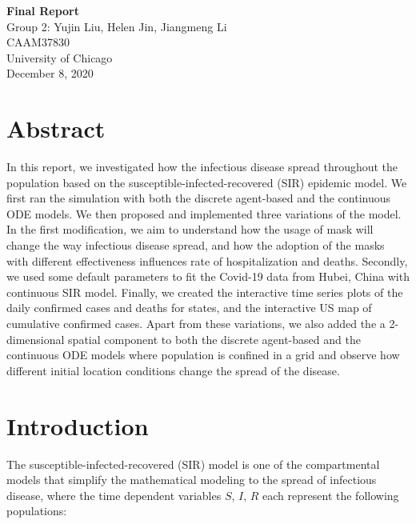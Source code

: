 \documentclass{article}
\begin{document}
\begin{titlepage}
  \begin{center}

    \huge
    \textbf{Final Report}\\
    \vspace{4.5cm}
    \LARGE
    Group 2: Yujin Liu, Helen Jin, Jiangmeng Li\\
    \vspace{4.5cm}
    \Large
    CAAM37830\\
    \vspace{1cm}
    University of Chicago\\
    \vspace{1cm}
    December 8, 2020

  \end{center}

\end{titlepage}

\section{Abstract}
In this report, we investigated how the infectious disease spread throughout the population based on the susceptible-infected-recovered (SIR) epidemic model. We first ran the simulation with both the discrete agent-based and the continuous ODE models. We then proposed and implemented three variations of the model. In the first modification, we aim to understand how the usage of mask will change the way infectious disease spread, and how the adoption of the masks with different effectiveness influences rate of hospitalization and deaths. Secondly, we used some default parameters to fit the Covid-19 data from Hubei, China with continuous SIR model. Finally, we created the interactive time series plots of the daily confirmed cases and deaths for states, and the interactive US map of cumulative confirmed cases. Apart from these variations, we also added the a 2-dimensional spatial component to both the discrete agent-based and the continuous ODE models where population is confined in a grid and observe how different initial location conditions change the spread of the disease. 

\section{Introduction}
The susceptible-infected-recovered (SIR) model is one of the compartmental models that simplify the mathematical modeling to the spread of infectious disease, where the time dependent variables $S$, $I$, $R$ each represent the following populations:
\end{document}
